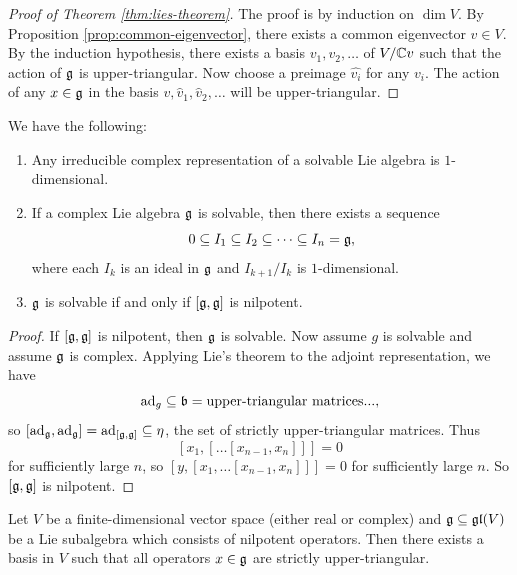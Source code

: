 \begin{proof}[Proof of Theorem \ref{thm:lies-theorem}]
  The proof is by induction on $\dim V$.
  By Proposition \ref{prop:common-eigenvector},
  there exists a common eigenvector
  $v \in V$. By the induction hypothesis,
  there exists a basis $v_1, v_2, \dots$
  of $V / \mathbb{C} v$ such that the action of
  $\mathfrak{g}$ is upper-triangular. Now choose a
  preimage $\widehat{v_i}$ for any $v_i$.
  The action of any $x \in \mathfrak{g}$ in the basis
  $v, \widehat{v}_1, \widehat{v}_2, \dots$
  will be upper-triangular.
\end{proof}

\begin{corollary}
  We have the following:
  \begin{enumerate}
    \item Any irreducible complex representation
      of a solvable Lie algebra is $1$-dimensional.
    \item If  a complex Lie algebra $\mathfrak{g}$ 
      is solvable, then there exists a sequence
      \[
        0 \subseteq I_1 \subseteq I_2 \subseteq \dots \subseteq I_n = \mathfrak{g},
      \]
      where each $I_k$ is an ideal in
      $\mathfrak{g}$ and $I_{k + 1} / I_k$
    is $1$-dimensional.
  \item $\mathfrak{g}$ is solvable if and only if
    $[\mathfrak{g}, \mathfrak{g}]$ is nilpotent.
  \end{enumerate}
\end{corollary}

\begin{proof}
  If $[\mathfrak{g}, \mathfrak{g}]$ is nilpotent, then
  $\mathfrak{g}$ is solvable. Now assume
  $g$ is solvable and assume $\mathfrak{g}$ 
  is complex. Applying Lie's theorem to the
  adjoint representation, we have
  \[
    \operatorname{ad}_g \subseteq \mathfrak{b} = \text{upper-triangular matrices}...,
  \]
  so $[\operatorname{ad}_{\mathfrak{g}}, \operatorname{ad}_{\mathfrak{g}}] = \operatorname{ad}_{[\mathfrak{g}, \mathfrak{g}]} \subseteq \eta$, the
  set of strictly upper-triangular matrices. Thus
  \[
    [x_1, [\dots [x_{n - 1}, x_n]]] = 0
  \]
  for sufficiently large $n$,
  so $[y, [x_1, \dots [x_{n - 1}, x_n]]] = 0$ for
  sufficiently large $n$. So $[\mathfrak{g}, \mathfrak{g}]$ is nilpotent.
\end{proof}

\begin{theorem}
  Let $V$ be a finite-dimensional 
  vector space (either real or complex)
  and $\mathfrak{g} \subseteq \mathfrak{gl}(V)$ be a Lie subalgebra
  which consists of nilpotent operators.
  Then there exists a basis in $V$ such that
  all operators $x \in \mathfrak{g}$ are strictly
  upper-triangular.
\end{theorem}

